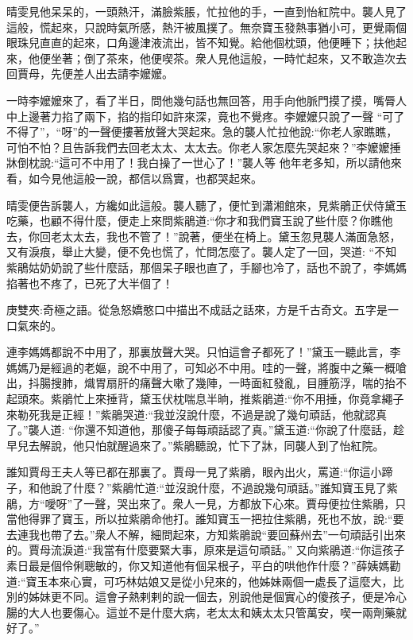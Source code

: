 \begin{parag}
    晴雯見他呆呆的，一頭熱汗，滿臉紫脹，忙拉他的手，一直到怡紅院中。襲人見了這般，慌起來，只說時氣所感，熱汗被風撲了。無奈寶玉發熱事猶小可，更覺兩個眼珠兒直直的起來，口角邊津液流出，皆不知覺。給他個枕頭，他便睡下；扶他起來，他便坐著；倒了茶來，他便喫茶。衆人見他這般，一時忙起來，又不敢造次去回賈母，先便差人出去請李嬤嬤。
\end{parag}


\begin{parag}
    一時李嬤嬤來了，看了半日，問他幾句話也無回答，用手向他脈門摸了摸，嘴脣人中上邊著力掐了兩下，掐的指印如許來深，竟也不覺疼。李嬤嬤只說了一聲 “可了不得了”，“呀”的一聲便摟著放聲大哭起來。急的襲人忙拉他說:“你老人家瞧瞧，可怕不怕？且告訴我們去回老太太、太太去。你老人家怎麼先哭起來？”李嬤嬤捶牀倒枕說:“這可不中用了！我白操了一世心了！”襲人等 他年老多知，所以請他來看，如今見他這般一說，都信以爲實，也都哭起來。
\end{parag}


\begin{parag}
    晴雯便告訴襲人，方纔如此這般。襲人聽了，便忙到瀟湘館來，見紫鵑正伏侍黛玉吃藥，也顧不得什麼，便走上來問紫鵑道:“你才和我們寶玉說了些什麼？你瞧他去，你回老太太去，我也不管了！”說著，便坐在椅上。黛玉忽見襲人滿面急怒，又有淚痕，舉止大變，便不免也慌了，忙問怎麼了。襲人定了一回，哭道: “不知紫鵑姑奶奶說了些什麼話，那個呆子眼也直了，手腳也冷了，話也不說了，李媽媽掐著也不疼了，已死了大半個了！\begin{note}庚雙夾:奇極之語。從急怒嬌憨口中描出不成話之話來，方是千古奇文。五字是一口氣來的。\end{note}連李媽媽都說不中用了，那裏放聲大哭。只怕這會子都死了！”黛玉一聽此言，李媽媽乃是經過的老嫗，說不中用了，可知必不中用。哇的一聲，將腹中之藥一概嗆出，抖腸搜肺，熾胃扇肝的痛聲大嗽了幾陣，一時面紅發亂，目腫筋浮，喘的抬不起頭來。紫鵑忙上來捶背，黛玉伏枕喘息半晌，推紫鵑道:“你不用捶，你竟拿繩子來勒死我是正經！”紫鵑哭道:“我並沒說什麼，不過是說了幾句頑話，他就認真了。”襲人道: “你還不知道他，那傻子每每頑話認了真。”黛玉道:“你說了什麼話，趁早兒去解說，他只怕就醒過來了。”紫鵑聽說，忙下了牀，同襲人到了怡紅院。
\end{parag}


\begin{parag}
    誰知賈母王夫人等已都在那裏了。賈母一見了紫鵑，眼內出火，罵道:“你這小蹄子，和他說了什麼？”紫鵑忙道:“並沒說什麼，不過說幾句頑話。”誰知寶玉見了紫鵑，方“噯呀”了一聲，哭出來了。衆人一見，方都放下心來。賈母便拉住紫鵑，只當他得罪了寶玉，所以拉紫鵑命他打。誰知寶玉一把拉住紫鵑，死也不放，說:“要去連我也帶了去。”衆人不解，細問起來，方知紫鵑說“要回蘇州去”一句頑話引出來的。賈母流淚道:“我當有什麼要緊大事，原來是這句頑話。” 又向紫鵑道:“你這孩子素日最是個伶俐聰敏的，你又知道他有個呆根子，平白的哄他作什麼？”薛姨媽勸道:“寶玉本來心實，可巧林姑娘又是從小兒來的，他姊妹兩個一處長了這麼大，比別的姊妹更不同。這會子熱剌剌的說一個去，別說他是個實心的傻孩子，便是冷心腸的大人也要傷心。這並不是什麼大病，老太太和姨太太只管萬安，喫一兩劑藥就好了。”
\end{parag}


